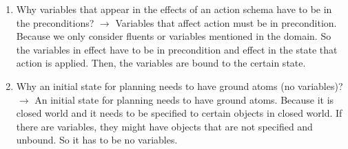 \documentclass[10pt]{article}
\begin{document}
\begin{enumerate}
\begin{enumerate}
\item Why variables that appear in the effects of an action schema have to be in the preconditions? \newline
$\rightarrow$ \newline
Variables that affect action must be in precondition. Because we only consider fluents or variables mentioned in the domain. So the variables in effect have to be in precondition and effect in the state that action is applied. Then, the variables are bound to the certain state.
\item Why an initial state for planning needs to have ground atoms (no variables)? \newline
$\rightarrow$ \newline
An initial state for planning needs to have ground atoms. Because it is closed world and it needs to be specified to certain objects in closed world. If there are variables, they might have objects that are not specified and unbound. So it has to be no variables.
\end{enumerate}

\end{enumerate}
\end{document}
